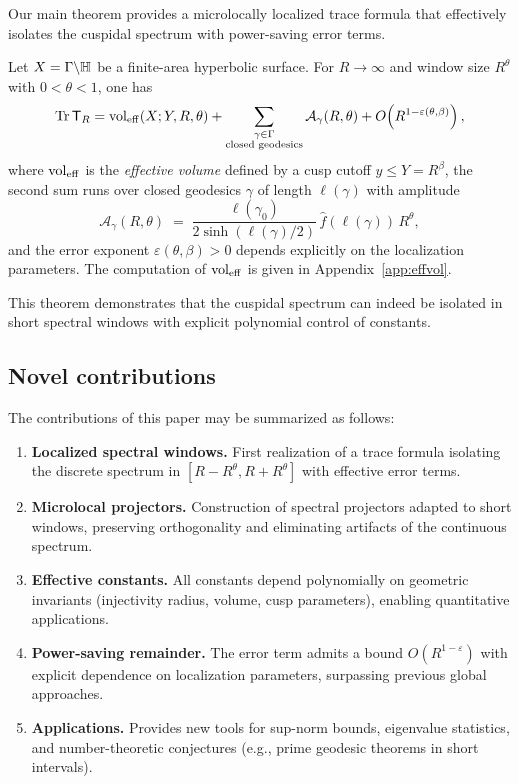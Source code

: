 Our main theorem provides a microlocally localized trace formula that effectively isolates the cuspidal spectrum with power-saving error terms.

\begin{theorem}\label{thm:main}
Let $X=\Gamma\backslash \mathbb{H}$ be a finite-area hyperbolic surface. For $R\to\infty$ and window size $R^\theta$ with $0<\theta<1$, one has
\[
\mathrm{Tr}\, \mathsf{T}_R
= \operatorname{vol}_{\mathrm{eff}}(X;Y,R,\theta)
+ \sum_{\substack{\gamma \in \Gamma \\ \text{closed geodesics}}} \mathcal{A}_\gamma(R,\theta)
+ O\!\left(R^{1-\varepsilon(\theta,\beta)}\right),
\]
where $\operatorname{vol}_{\mathrm{eff}}$ is the \emph{effective volume} defined by a cusp cutoff $y\le Y=R^\beta$, the second sum runs over closed geodesics $\gamma$ of length $\ell(\gamma)$ with amplitude
\[
\mathcal{A}_\gamma(R,\theta) \;=\; 
\frac{\ell(\gamma_0)}{2\sinh(\ell(\gamma)/2)} \,\widehat{f}(\ell(\gamma))\,R^\theta,
\]
and the error exponent $\varepsilon(\theta,\beta)>0$ depends explicitly on the localization parameters. The computation of $\operatorname{vol}_{\mathrm{eff}}$ is given in Appendix~\ref{app:effvol}.
\end{theorem}

This theorem demonstrates that the cuspidal spectrum can indeed be isolated in short spectral windows with explicit polynomial control of constants.

\subsection{Novel contributions}\label{subsec:novelty}

The contributions of this paper may be summarized as follows:

\begin{enumerate}
  \item \textbf{Localized spectral windows.} First realization of a trace formula isolating the discrete spectrum in $[R-R^\theta, R+R^\theta]$ with effective error terms.
  \item \textbf{Microlocal projectors.} Construction of spectral projectors adapted to short windows, preserving orthogonality and eliminating artifacts of the continuous spectrum.
  \item \textbf{Effective constants.} All constants depend polynomially on geometric invariants (injectivity radius, volume, cusp parameters), enabling quantitative applications.
  \item \textbf{Power-saving remainder.} The error term admits a bound $O(R^{1-\varepsilon})$ with explicit dependence on localization parameters, surpassing previous global approaches.
  \item \textbf{Applications.} Provides new tools for sup-norm bounds, eigenvalue statistics, and number-theoretic conjectures (e.g., prime geodesic theorems in short intervals).
\end{enumerate}

